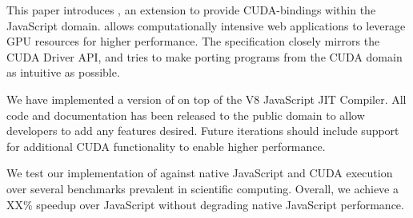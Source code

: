 
This paper introduces \namens, an extension to provide CUDA-bindings within the
JavaScript domain. \name allows computationally intensive  web applications to
leverage GPU resources for higher performance. The specification closely mirrors
the CUDA Driver API, and tries to make porting programs from the CUDA domain as
intuitive as possible.

We have implemented a version of \name on top of the V8 JavaScript JIT
Compiler.  All code and documentation has been released to the public domain to
allow developers to add any features desired. Future iterations should include
support for additional CUDA functionality to enable higher performance.

We test our implementation of \name against native JavaScript and CUDA execution
over several benchmarks prevalent in scientific computing. Overall, we achieve a
XX\% speedup over JavaScript without degrading native JavaScript performance.
